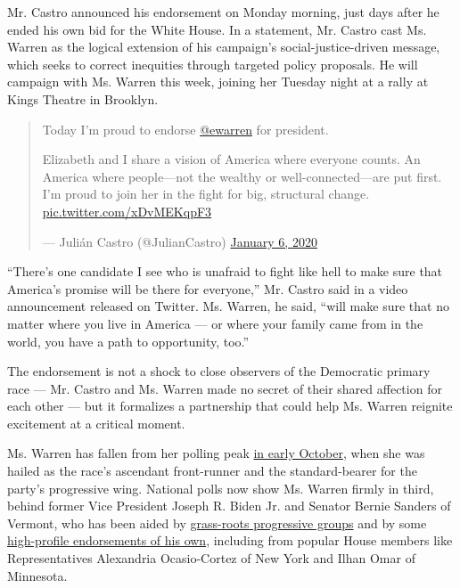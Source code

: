 Mr. Castro announced his endorsement on Monday morning, just days after
he ended his own bid for the White House. In a statement, Mr. Castro
cast Ms. Warren as the logical extension of his campaign's
social-justice-driven message, which seeks to correct inequities through
targeted policy proposals. He will campaign with Ms. Warren this week,
joining her Tuesday night at a rally at Kings Theatre in Brooklyn.

\begin{quote}
Today I'm proud to endorse
\href{https://twitter.com/ewarren?ref_src=twsrc\%5Etfw}{@ewarren} for
president.

Elizabeth and I share a vision of America where everyone counts. An
America where people⁠---not the wealthy or well-connected⁠---are put
first. I'm proud to join her in the fight for big, structural change.
\href{https://t.co/xDvMEKqpF3}{pic.twitter.com/xDvMEKqpF3}

--- Julián Castro (@JulianCastro)
\href{https://twitter.com/JulianCastro/status/1214188178686525440?ref_src=twsrc\%5Etfw}{January
6, 2020}
\end{quote}

``There's one candidate I see who is unafraid to fight like hell to make
sure that America's promise will be there for everyone,'' Mr. Castro
said in a video announcement released on Twitter. Ms. Warren, he said,
``will make sure that no matter where you live in America --- or where
your family came from in the world, you have a path to opportunity,
too.''

The endorsement is not a shock to close observers of the Democratic
primary race --- Mr. Castro and Ms. Warren made no secret of their
shared affection for each other --- but it formalizes a partnership that
could help Ms. Warren reignite excitement at a critical moment.

Ms. Warren has fallen from her polling peak
\href{https://www.nytimes.com/2019/12/31/us/politics/democratic-race-2020.html}{in
early October}, when she was hailed as the race's ascendant front-runner
and the standard-bearer for the party's progressive wing. National polls
now show Ms. Warren firmly in third, behind former Vice President Joseph
R. Biden Jr. and Senator Bernie Sanders of Vermont, who has been aided
by
\href{https://www.nytimes.com/2019/12/10/us/politics/bernie-sanders-2020.html}{grass-roots
progressive groups} and by some
\href{https://www.nytimes.com/2019/10/19/us/politics/bernie-sanders-aoc-queensbridge-park.html}{high-profile
endorsements of his own}, including from popular House members like
Representatives Alexandria Ocasio-Cortez of New York and Ilhan Omar of
Minnesota.

